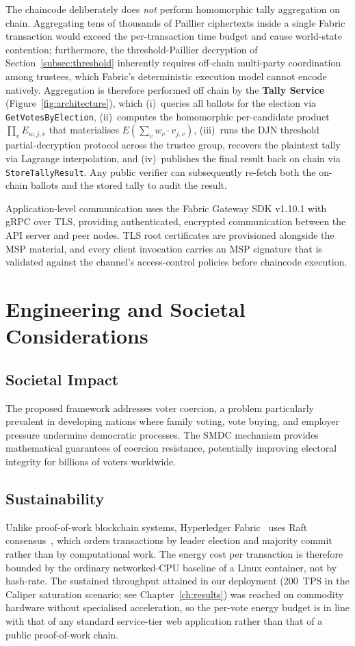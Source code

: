 The chaincode deliberately does \emph{not} perform homomorphic tally aggregation on chain. Aggregating tens of thousands of Paillier ciphertexts inside a single Fabric transaction would exceed the per-transaction time budget and cause world-state contention; furthermore, the threshold-Paillier decryption of Section~\ref{subsec:threshold} inherently requires off-chain multi-party coordination among trustees, which Fabric's deterministic execution model cannot encode natively. Aggregation is therefore performed off chain by the \textbf{Tally Service} (Figure~\ref{fig:architecture}), which (i)~queries all ballots for the election via \texttt{GetVotesByElection}, (ii)~computes the homomorphic per-candidate product $\prod_v E_{w,j,v}$ that materialises $E(\sum_v w_v \cdot v_{j,v})$, (iii)~runs the DJN threshold partial-decryption protocol across the trustee group, recovers the plaintext tally via Lagrange interpolation, and (iv)~publishes the final result back on chain via \texttt{StoreTallyResult}. Any public verifier can subsequently re-fetch both the on-chain ballots and the stored tally to audit the result.

Application-level communication uses the Fabric Gateway SDK v1.10.1 with gRPC over TLS, providing authenticated, encrypted communication between the API server and peer nodes. TLS root certificates are provisioned alongside the MSP material, and every client invocation carries an MSP signature that is validated against the channel's access-control policies before chaincode execution.

\section{Engineering and Societal Considerations}
\label{sec:engineering}

\subsection{Societal Impact}
The proposed framework addresses voter coercion, a problem particularly prevalent in developing nations where family voting, vote buying, and employer pressure undermine democratic processes. The SMDC mechanism provides mathematical guarantees of coercion resistance, potentially improving electoral integrity for billions of voters worldwide.

\subsection{Sustainability}
Unlike proof-of-work blockchain systems, Hyperledger Fabric~\cite{androulaki2018} uses Raft consensus~\cite{ongaro2014raft}, which orders transactions by leader election and majority commit rather than by computational work. The energy cost per transaction is therefore bounded by the ordinary networked-CPU baseline of a Linux container, not by hash-rate. The sustained throughput attained in our deployment (200~TPS in the Caliper saturation scenario; see Chapter~\ref{ch:results}) was reached on commodity hardware without specialised acceleration, so the per-vote energy budget is in line with that of any standard service-tier web application rather than that of a public proof-of-work chain.

